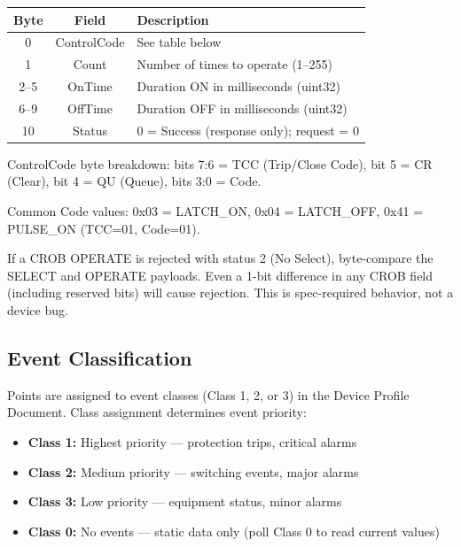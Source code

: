 \documentclass[11pt,twoside]{article}
\begin{document}
\begin{center}
\begin{tabularx}{0.8\textwidth}{|c|c|X|}
\hline
\textbf{Byte} & \textbf{Field} & \textbf{Description} \\
\hline
0 & ControlCode & See table below \\
1 & Count & Number of times to operate (1--255) \\
2--5 & OnTime & Duration ON in milliseconds (uint32) \\
6--9 & OffTime & Duration OFF in milliseconds (uint32) \\
10 & Status & 0 = Success (response only); request = 0 \\
\hline
\end{tabularx}
\end{center}

ControlCode byte breakdown: bits 7:6 = TCC (Trip/Close Code), bit 5 = CR (Clear), bit 4 = QU (Queue), bits 3:0 = Code.

Common Code values: 0x03 = LATCH\_ON, 0x04 = LATCH\_OFF, 0x41 = PULSE\_ON (TCC=01, Code=01).

\begin{warnbox}
If a CROB OPERATE is rejected with status 2 (No Select), byte-compare the SELECT and OPERATE payloads. Even a 1-bit difference in any CROB field (including reserved bits) will cause rejection. This is spec-required behavior, not a device bug.
\end{warnbox}

\subsection{Event Classification}

Points are assigned to event classes (Class 1, 2, or 3) in the Device Profile Document. Class assignment determines event priority:
\begin{itemize}[noitemsep]
  \item \textbf{Class 1:} Highest priority --- protection trips, critical alarms
  \item \textbf{Class 2:} Medium priority --- switching events, major alarms
  \item \textbf{Class 3:} Low priority --- equipment status, minor alarms
  \item \textbf{Class 0:} No events --- static data only (poll Class 0 to read current values)
\end{itemize}

\end{document}
